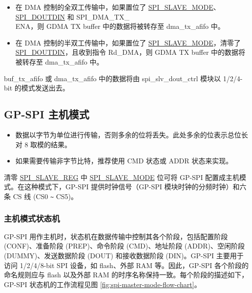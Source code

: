 \documentclass[main\_\_CN.tex]{subfiles}
\begin{document}
\begin{itemize}
\begin{itemize}
        \item 在 DMA 控制的全双工传输中，如果置位了 \hyperref[fielddesc:SPISLAVEMODE]{SPI\_SLAVE\_MODE}、\hyperref[fielddesc:SPIDOUTDIN]{SPI\_DOUTDIN} 和 SPI\_DMA\_TX\_\\ENA，则 GDMA TX buffer 中的数据将被转存至 dma\_tx\_afifo 中。

        \item 在 DMA 控制的半双工传输中，如果置位了  \hyperref[fielddesc:SPISLAVEMODE]{SPI\_SLAVE\_MODE}，清零了  \hyperref[fielddesc:SPIDOUTDIN]{SPI\_DOUTDIN}，且收到指令 Rd\_DMA，则 GDMA TX buffer 中的数据将被转存至 dma\_tx\_afifo 中。

    \end{itemize}

buf\_tx\_afifo 或 dma\_tx\_afifo 中的数据将由 spi\_slv\_dout\_ctrl 模块以 1/2/4-bit 的模式发送出去。
\end{itemize}
\subsection{GP-SPI 主机模式}\label{sec:gp-spi2-master-mode}

\begin{tiplisting}
\vspace{-2em}
\begin{itemize}
    \item 数据以字节为单位进行传输，否则多余的位将丢失。此处多余的位表示总位长对 8 取模的结果。
    \item 如果需要传输非字节比特，推荐使用 CMD 状态或 ADDR 状态来实现。
\end{itemize}
\end{tiplisting}

清零  \hyperref[fielddesc:SPISLAVEMODE]{SPI\_SLAVE\_REG} 中  \hyperref[regdesc:SPISLAVEREG]{SPI\_SLAVE\_MODE} 位可将 GP-SPI 配置成主机模式。在这种模式下，GP-SPI 提供时钟信号（GP-SPI 模块时钟的分频时钟）和六条 CS 线 (CS0 \verb+~+ CS5)。

\subsubsection{主机模式状态机}
\label{sec:gp-spi2-state-machine}

GP-SPI 用作主机时，状态机在数据传输中控制其各个阶段，包括配置阶段 (CONF)、准备阶段 (PREP)、命令阶段 (CMD)、地址阶段 (ADDR)、空闲阶段 (DUMMY)、发送数据阶段 (DOUT) 和接收数据阶段 (DIN)。GP-SPI 主要用于访问 1/2/4/8-bit SPI 设备，如 flash、外部 RAM 等。因此，GP-SPI 各个阶段的命名规则应与 flash 以及外部 RAM 的时序名称保持一致。每个阶段的描述如下，GP-SPI 状态机的工作流程见图  \ref{fig:spi-master-mode-flow-chart}。
\end{document}
